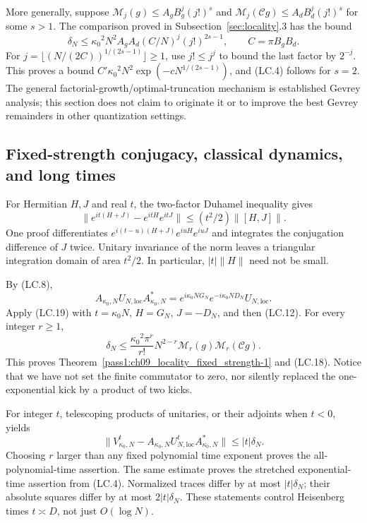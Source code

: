 More generally, suppose \(\mathcal M_j(g)\leq A_gB_g^j(j!)^s\) and \(\mathcal M_j(\mathcal Cg)\leq A_dB_d^j(j!)^s\) for some \(s>1\). The comparison proved in Subsection~\ref{sec:locality}.3 has the bound \[
 \delta_N\leq{\kappa_0}^2N^2A_gA_d(C/N)^j(j!)^{2s-1},
 \qquad C=\pi B_gB_d.                                      \tag{LC.18}
\] For \(j=\lfloor(N/(2C))^{1/(2s-1)}\rfloor\geq1\), use \(j!\leq j^j\) to bound the last factor by \(2^{-j}\). This proves a bound \(C'{\kappa_0}^2N^2\exp(-cN^{1/(2s-1)})\), and (LC.4) follows for \(s=2\). The general factorial-growth/optimal-truncation mechanism is established Gevrey analysis; this section does not claim to originate it or to improve the best Gevrey remainders in other quantization settings.

\subsection{Fixed-strength conjugacy, classical dynamics, and long times}\label{locality:fixed-strength-conjugacy-classical-dynamics-and-long-times}

For Hermitian \(H,J\) and real \(t\), the two-factor Duhamel inequality gives \[
 \|e^{it(H+J)}-e^{itH}e^{itJ}\|\leq(t^2/2)\|[H,J]\|.        \tag{LC.19}
\] One proof differentiates \(e^{i(t-u)(H+J)}e^{iuH}e^{iuJ}\) and integrates the conjugation difference of \(J\) twice. Unitary invariance of the norm leaves a triangular integration domain of area \(t^2/2\). In particular, \(|t|\|H\|\) need not be small.

By (LC.8), \[
 A_{{\kappa_0},N}U_{N,\mathrm{loc}}A_{{\kappa_0},N}^*
       =e^{i{\kappa_0} NG_N}e^{-i{\kappa_0} ND_N}U_{N,\mathrm{loc}}.
\] Apply (LC.19) with \(t={\kappa_0} N\), \(H=G_N\), \(J=-D_N\), and then (LC.12). For every integer \(r\geq1\), \[
 \boxed{\displaystyle
 \delta_N\leq\frac{{\kappa_0}^2\pi^r}{r!}N^{2-r}
                   \mathcal M_r(g)\mathcal M_r(\mathcal Cg).} \tag{LC.20}
\] This proves Theorem~\ref{pass1:ch09_locality_fixed_strength-1} and (LC.18). Notice that we have not set the finite commutator to zero, nor silently replaced the one-exponential kick by a product of two kicks.

For integer \(t\), telescoping products of unitaries, or their adjoints when \(t<0\), yields \[
 \|V_{{\kappa_0},N}^t-A_{{\kappa_0},N}U_{N,\mathrm{loc}}^tA_{{\kappa_0},N}^*\|
       \leq |t|\delta_N.                                   \tag{LC.21}
\] Choosing \(r\) larger than any fixed polynomial time exponent proves the all-polynomial-time assertion. The same estimate proves the stretched exponential-time assertion from (LC.4). Normalized traces differ by at most \(|t|\delta_N\); their absolute squares differ by at most \(2|t|\delta_N\). These statements control Heisenberg times \(t\asymp D\), not just \(O(\log N)\).

